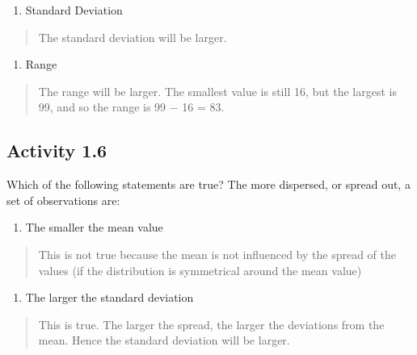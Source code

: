 \documentclass[
]{memoir}
\providecommand{\tightlist}{%
  \setlength{\itemsep}{0pt}\setlength{\parskip}{0pt}}
\begin{document}
\begin{enumerate}
\def\labelenumi{\alph{enumi})}
\setcounter{enumi}{1}
\tightlist
\item
  Standard Deviation
\end{enumerate}

\begin{quote}
The standard deviation will be larger.
\end{quote}

\begin{enumerate}
\def\labelenumi{\alph{enumi})}
\setcounter{enumi}{2}
\tightlist
\item
  Range
\end{enumerate}

\begin{quote}
The range will be larger. The smallest value is still 16, but the largest is 99, and so the range is 99 − 16 = 83.
\end{quote}

\hypertarget{activity-1.6}{%
\subsection*{Activity 1.6}\label{activity-1.6}}

Which of the following statements are true? The more dispersed, or spread out, a set of observations are:

\begin{enumerate}
\def\labelenumi{\alph{enumi})}
\tightlist
\item
  The smaller the mean value
\end{enumerate}

\begin{quote}
This is not true because the mean is not influenced by the spread of the values (if the distribution is symmetrical around the mean value)
\end{quote}

\begin{enumerate}
\def\labelenumi{\alph{enumi})}
\setcounter{enumi}{1}
\tightlist
\item
  The larger the standard deviation
\end{enumerate}

\begin{quote}
This is true. The larger the spread, the larger the deviations from the mean. Hence the standard deviation will be larger.
\end{quote}
\end{document}
